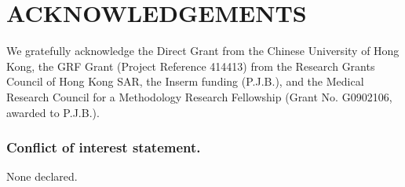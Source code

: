 \documentclass[a4,center,fleqn]{NAR}
\begin{document}
\section{ACKNOWLEDGEMENTS}

We gratefully acknowledge the Direct Grant from the Chinese University of Hong Kong, the GRF Grant (Project Reference 414413) from the Research Grants Council of Hong Kong SAR, the Inserm funding (P.J.B.), and the Medical Research Council for a Methodology Research Fellowship (Grant No. G0902106, awarded to P.J.B.).

\subsubsection{Conflict of interest statement.} None declared.
\newpage

\end{document}
